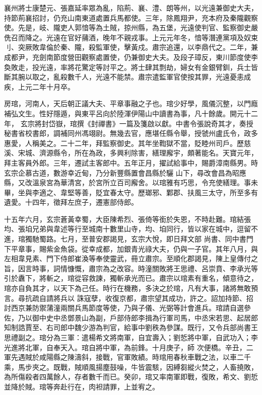 \begin{pinyinscope}
 襄州將士康楚元、張嘉延率眾為亂，陷荊、襄、澧、朗等州，以光遠兼御史大夫，持節荊襄招討，仍充山南東道處置兵馬都使。三年，除鳳翔尹，充本府及秦隴觀察使。先是，岐、隴吏人郭愔等為土賊，掠州縣，為五堡，光遠使判官、監察御史嚴侁召而降之。光遠在官好蒱酒，晚年不親戎事。上元元年冬，愔等潛連黨項及奴束刂、突厥敗韋倫於秦、隴，殺監軍使，擊黃戍。肅宗追還，以李鼎代之。二年，兼
 成都尹，充劍南節度營田觀察處置使，仍兼御史大夫。及段子璋反，東川節度使李奐敗走，投光遠，率將花驚定等討平之。將士肆其剽劫，婦女有金銀臂釧，兵士皆斷其腕以取之，亂殺數千人，光遠不能禁。肅宗遣監軍官使按其罪，光遠憂恚成疾，上元二年十月卒。



 房琯，河南人，天后朝正議大夫、平章事融之子也。琯少好學，風儀沉整，以門廕補弘文生。性好隱遁，與東平呂向於陸渾伊陽山中讀書為事，凡十餘歲。開元十二年，
 玄宗將封岱嶽，琯撰《封禪書》一篇及箋啟以獻。中書令張說奇其才，奏授秘書省校書郎，調補同州馮翊尉。無幾去官，應堪任縣令舉，授虢州盧氏令，政多惠愛，人稱美之。二十二年，拜監察御史。其年坐鞫獄不當，貶睦州司戶。歷慈溪、宋城、濟源縣令，所在為政，多興利除害，繕理廨宇，頗著能名。天寶元年，拜主客員外郎。三年，遷試主客郎中。五年正月，擢試給事中，賜爵漳南縣男。時玄宗企慕古道，數游幸近甸，乃分新豐縣置會昌縣於驪
 山下，尋改會昌為昭應縣，又改溫泉宮為華清宮，於宮所立百司廨舍。以琯雅有巧思，令充使繕理。事未畢，坐與李適之、韋堅等善，貶宜春太守。歷瑯邪、鄴郡、扶風三太守，所至多有遺愛。十四年，徵拜左庶子，遷憲部侍郎。



 十五年六月，玄宗蒼黃幸蜀，大臣陳希烈、張倚等銜於失恩，不時赴難。琯結張均、張垍兄弟與韋述等行至城南十數里山寺，均、垍同行，皆以家在城中，逗留不進，琯獨馳蜀路。七月，至普安郡謁見，玄宗大悅，即日拜文部
 尚書、同中書門下平章事，賜紫金魚袋。從幸成都，加銀青光祿大夫，仍與一子官。其年八月，與左相韋見素、門下侍郎崔渙等奉使靈武，冊立肅宗。至順化郡謁見，陳上皇傳付之旨，因言時事，詞情慷慨，肅宗為之改容。時潼關敗將王思禮、呂崇賁、李承光等引於纛下，將斬之，琯從容救諫，獨斬承光而已。肅宗以琯素有重名，傾意待之，琯亦自負其才，以天下為己任。時行在機務，多決之於琯，凡有大事，諸將無敢預言。尋抗疏自請將兵以
 誅寇孽，收復京都，肅宗望其成功，許之。詔加持節、招討西京兼防禦蒲潼兩關兵馬節度等使，乃與子儀、光弼等計會進兵。琯請自選參佐，乃以御中史中丞鄧景山為副，戶部侍郎李揖為行軍司馬，中丞宋若思、起居郎知制誥賈至、右司郎中魏少游為判官，給事中劉秩為參謀。既行，又令兵部尚書王思禮副之。琯分為三軍：遣楊希文將南軍，自宜壽入；劉悊將中軍，自武功入；李光進將北軍，自奉天入。琯自將中軍，為前鋒。十月庚子，師
 次便橋。辛丑，二軍先遇賊於咸陽縣之陳濤斜，接戰，官軍敗績。時琯用春秋車戰之法，以車二千乘，馬步夾之。既戰，賊順風揚塵鼓噪，牛皆震駭，因縛芻縱火焚之，人畜撓敗，為所傷殺者四萬餘人，存者數千而已。癸卯，琯又率南軍即戰，復敗，希文、劉悊並降於賊。琯等奔赴行在，肉袒請罪，上並宥之。




\end{pinyinscope}
